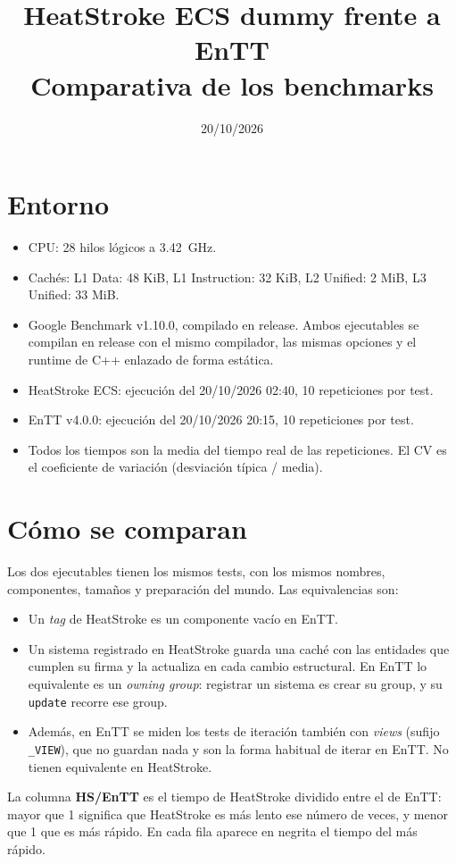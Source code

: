 \documentclass[11pt,a4paper]{article}
\title{HeatStroke ECS dummy frente a EnTT\\Comparativa de los benchmarks}
\date{20/10/2026}
\author{}
\begin{document}
\maketitle
\sloppy %

\section*{Entorno}
\begin{itemize}
  \item CPU: 28 hilos lógicos a 3.42~GHz.
  \item Cachés: L1 Data: 48 KiB, L1 Instruction: 32 KiB, L2 Unified: 2 MiB, L3 Unified: 33 MiB.
  \item Google Benchmark v1.10.0, compilado en release. Ambos ejecutables se compilan en release con el mismo compilador, las mismas opciones y el runtime de C++ enlazado de forma estática.
  \item HeatStroke ECS: ejecución del 20/10/2026 02:40, 10 repeticiones por test.
  \item EnTT v4.0.0: ejecución del 20/10/2026 20:15, 10 repeticiones por test.
  \item Todos los tiempos son la media del tiempo real de las repeticiones. El CV es el coeficiente de variación (desviación típica / media).
\end{itemize}

\section*{Cómo se comparan}
Los dos ejecutables tienen los mismos tests, con los mismos nombres, componentes, tamaños y preparación del mundo. Las equivalencias son:
\begin{itemize}
  \item Un \emph{tag} de HeatStroke es un componente vacío en EnTT.
  \item Un sistema registrado en HeatStroke guarda una caché con las entidades que cumplen su firma y la actualiza en cada cambio estructural. En EnTT lo equivalente es un \emph{owning group}: registrar un sistema es crear su group, y su \texttt{update} recorre ese group.
  \item Además, en EnTT se miden los tests de iteración también con \emph{views} (sufijo \texttt{\_VIEW}), que no guardan nada y son la forma habitual de iterar en EnTT. No tienen equivalente en HeatStroke.
\end{itemize}
La columna \textbf{HS/EnTT} es el tiempo de HeatStroke dividido entre el de EnTT: mayor que 1 significa que HeatStroke es más lento ese número de veces, y menor que 1 que es más rápido. En cada fila aparece en negrita el tiempo del más rápido.
\end{document}
